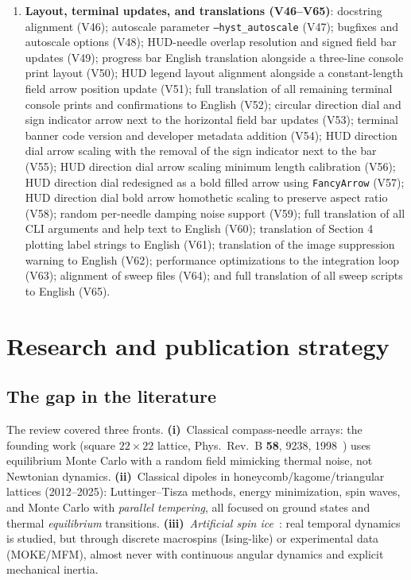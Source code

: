 \documentclass[11pt,a4paper]{article}
\newcommand{\code}[1]{\texttt{#1}}
\begin{document}
\begin{enumerate}
\item \textbf{Layout, terminal updates, and translations (V46--V65)}: docstring alignment (V46); autoscale parameter \code{--hyst\_autoscale} (V47); bugfixes and autoscale options (V48); HUD-needle overlap resolution and signed field bar updates (V49); progress bar English translation alongside a three-line console print layout (V50); HUD legend layout alignment alongside a constant-length field arrow position update (V51); full translation of all remaining terminal console prints and confirmations to English (V52); circular direction dial and sign indicator arrow next to the horizontal field bar updates (V53); terminal banner code version and developer metadata addition (V54); HUD direction dial arrow scaling with the removal of the sign indicator next to the bar (V55); HUD direction dial arrow scaling minimum length calibration (V56); HUD direction dial redesigned as a bold filled arrow using \code{FancyArrow} (V57); HUD direction dial bold arrow homothetic scaling to preserve aspect ratio (V58); random per-needle damping noise support (V59); full translation of all CLI arguments and help text to English (V60); translation of Section 4 plotting label strings to English (V61); translation of the image suppression warning to English (V62); performance optimizations to the integration loop (V63); alignment of sweep files (V64); and full translation of all sweep scripts to English (V65).
\end{enumerate}

\section{Research and publication strategy}
\label{sec:research}

\subsection{The gap in the literature}

\noindent The review covered three fronts. \textbf{(i)}~Classical compass-needle arrays: the founding work (square $22\times22$ lattice, Phys.\ Rev.\ B \textbf{58}, 9238, 1998~\cite{prb1998}) uses equilibrium Monte Carlo with a random field mimicking thermal noise, not Newtonian dynamics. \textbf{(ii)}~Classical dipoles in honeycomb/kagome/triangular lattices (2012--2025): Luttinger--Tisza methods, energy minimization, spin waves, and Monte Carlo with \emph{parallel tempering}, all focused on ground states and thermal \emph{equilibrium} transitions. \textbf{(iii)}~\emph{Artificial spin ice}~\cite{nisoli2013}: real temporal dynamics is studied, but through discrete macrospins (Ising-like) or experimental data (MOKE/MFM), almost never with continuous angular dynamics and explicit mechanical inertia.
\end{document}

